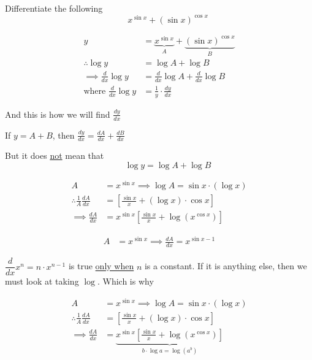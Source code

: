 \documentclass[14pt,fleqn]{extarticle}
\begin{document}
 

\newcommand\ft{x^{\sin x}}
\newcommand\st{\left(\sin x \right)^{\cos x}}

Differentiate the following 
\[ \qquad x^{\sin x} + \left(\sin x \right)^{\cos x} \] 

\newcard 

\begin{align}
	y &= \underbrace{\ft}_A + \underbrace{\st}_B \\
	\therefore \log y &= \log A + \log B  \\
	\implies \frac{d}{dx}\log y &= \frac{d}{dx}\log A + \frac{d}{dx}\log B \\
	\text{where } \frac{d}{dx}\log y &= \frac{1}{y}\cdot \frac{dy}{dx}
\end{align}

And this is how we will find $\frac{dy}{dx}$ 

\newcard 

If $y = A + B$, then $\frac{dy}{dx} = \frac{dA}{dx} + \frac{dB}{dx}$ \newline 

But it does \underline{not} mean that 
\[ \qquad \log y = \log A + \log B \] 

\newcard 

\begin{align}
	A &= \ft \implies \log A = \sin x\cdot \left(\log x \right) \\
	\therefore \frac{1}{A} \frac{dA}{dx} &= \left[\frac{\sin x}{x} + \left(\log x \right)\cdot \cos x  \right] \\
	\implies \frac{dA}{dx} &= \ft \left[\frac{\sin x}{x} + \log \left(x^{\cos x} \right)\right]
\end{align}

\newcard 

\begin{align}
	A &= \ft \implies \frac{dA}{dx} = x^{ \sin x - 1} 
\end{align}

\newcard 

$\dfrac{d}{dx}x^n = n\cdot x^{n-1}$ is true \underline{only when} $n$ is a constant. If it is anything else, then we must look at taking $\log$. Which is why 

\begin{align}
	A &= \ft \implies \log A = \sin x\cdot \left(\log x \right) \\
	\therefore \frac{1}{A} \frac{dA}{dx} &= \left[\frac{\sin x}{x} + \left(\log x \right)\cdot \cos x  \right] \\
	\implies \frac{dA}{dx} &= \underbrace{\ft \left[\frac{\sin x}{x} + \log \left(x^{\cos x} \right)\right]}_{b\cdot \log a = \log \left(a^b \right)}
	\end{align} 
	
\end{document}
